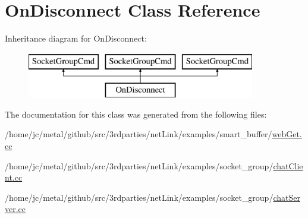 \hypertarget{classOnDisconnect}{}\section{On\+Disconnect Class Reference}
\label{classOnDisconnect}
Inheritance diagram for On\+Disconnect\+:\begin{figure}[H]
\begin{center}
\leavevmode
\includegraphics[height=2.000000cm]{classOnDisconnect}
\end{center}
\end{figure}


The documentation for this class was generated from the following files\+:\begin{DoxyCompactItemize}
\item 
/home/jc/metal/github/src/3rdparties/net\+Link/examples/smart\+\_\+buffer/\hyperlink{webGet_8cc}{web\+Get.\+cc}\item 
/home/jc/metal/github/src/3rdparties/net\+Link/examples/socket\+\_\+group/\hyperlink{chatClient_8cc}{chat\+Client.\+cc}\item 
/home/jc/metal/github/src/3rdparties/net\+Link/examples/socket\+\_\+group/\hyperlink{chatServer_8cc}{chat\+Server.\+cc}\end{DoxyCompactItemize}
